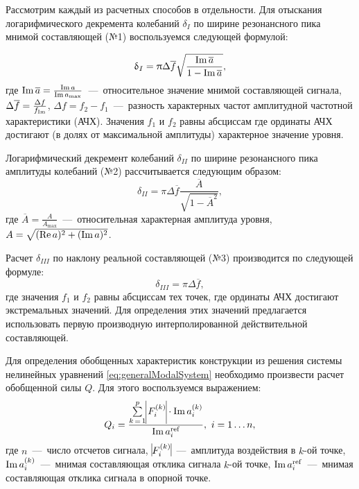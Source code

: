 Рассмотрим каждый из расчетных способов в отдельности. Для отыскания логарифмического декремента колебаний $ \delta_I $ по ширине резонансного пика мнимой составляющей (№1) воспользуемся следующей формулой:

\begin{equation}
	\updelta_I = \uppi \Delta \overline{f} \sqrt{\frac{\operatorname{Im} \overline{a}}{1 - \operatorname{Im} \overline{a}}}, \label{eq:decrementWidthImaginaryPeak}
\end{equation}
где $ \operatorname{Im} \overline{a} = \frac{\operatorname{Im} a}{\operatorname{Im} a_{\max}} $~---~относительное значение мнимой составляющей сигнала, $ \Delta \overline{f} = \frac{\Delta f}{f_{\operatorname{Im}}}$, $ \Delta f = f_2 - f_1 $~---~разность характерных частот амплитудной частотной характеристики (АЧХ). Значения $ f_1 $ и $ f_2 $ равны абсциссам где ординаты АЧХ достигают (в долях от максимальной амплитуды) характерное значение уровня.

Логарифмический декремент колебаний $ \delta_{II} $ по ширине резонансного пика амплитуды колебаний (№2) рассчитывается следующим образом:
\begin{equation}
	\delta_{II} = \pi \Delta \overline{f} \frac{\overline{A}}{\sqrt{1 - \overline{A} ^ 2}}, \label{eq:decrementWidthAmplitudePeak}
\end{equation}
где $ \overline{A} = \frac{A}{A_{\max}}$~---~относительная характерная амплитуда уровня, $ A = \sqrt{(\operatorname{Re} a) ^ 2 + (\operatorname{Im} a) ^ 2} $.

Расчет  $ \delta_{III} $ по наклону реальной составляющей (№3) производится по следующей формуле:
\begin{equation}
	\delta_{III} = \pi \Delta \overline{f},
	\label{eq:decrementAngleReal}
\end{equation}
где значения $ f_1 $ и $ f_2 $ равны абсциссам тех точек, где ординаты АЧХ достигают экстремальных значений. Для определения этих значений предлагается использовать первую производную интерполированной действительной составляющей.

Для определения обобщенных характеристик конструкции из решения системы нелинейных уравнений \eqref{eq:generalModalSystem} необходимо произвести расчет обобщенной силы $ Q $. Для этого воспользуемся выражением:
\begin{equation}
	Q_i = \frac{\sum\limits_{k\,=\,1} ^ p \vline F_i ^ {(k)} \vline \cdot \imag a_i ^ {(k)}}{\imag a_i ^ {\text{ref}}}, \ i = 1 \hdots n,
\end{equation}
где $ n $~---~число отсчетов сигнала, $ \vline F_i ^ {(k)} \vline $~---~амплитуда воздействия в $ k $-ой точке, $ \operatorname{Im} a_i ^ {(k)} $~---~мнимая составляющая отклика сигнала $ k $-ой точке, $ \operatorname{Im} a_i ^ {\text{ref}} $~---~мнимая составляющая отклика сигнала в опорной точке.

